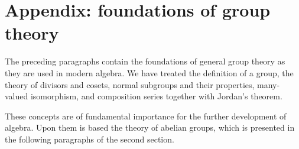 \documentclass[11pt]{article}
\begin{document}
\section*{Appendix: foundations of group theory}

The preceding paragraphs contain the foundations of general group theory as they are used in modern algebra. We have treated the definition of a group, the theory of divisors and cosets, normal subgroups and their properties, many-valued isomorphism, and composition series together with Jordan's theorem.

These concepts are of fundamental importance for the further development of algebra. Upon them is based the theory of abelian groups, which is presented in the following paragraphs of the second section.
\end{document}
